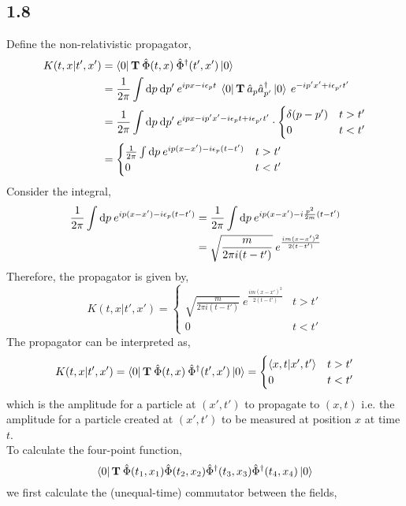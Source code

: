 \documentclass[12pt]{extarticle}
\newcommand{\field}{\hat{\Phi}}
\newcommand{\dfield}{\hat{\Phi}^\dagger}
\begin{document}
\subsection*{1.8}
Define the non-relativistic propagator, 
\begin{align*}
K(t,x|t',x') & = \bra{0} \bf{T} \: \field(t, x) \: \dfield(t', x') \ket{0}
\\
& = \frac{1}{2 \pi} \int \d{p} \d{p'} e^{i p x - i \epsilon_p t}  \: \bra{0} \bf{T} \: \a_p \adag_{p'} \ket{0} \: e^{- i p' x' + i \epsilon_{p'} t'} 
\\
& = \frac{1}{2 \pi} \int \d{p} \d{p'} e^{i p x - i p' x' - i \epsilon_p t + i \epsilon_{p'} t'} \cdot
\begin{cases}
\delta(p - p') & t > t'\\
0  & t < t'
\end{cases}
\\
& = 
\begin{cases}
\frac{1}{2 \pi} \int \d{p} e^{i p (x - x') - i \epsilon_p (t - t')} & t > t' \\
0 & t < t'
\end{cases}
\end{align*}
Consider the integral,
\begin{align*}
\frac{1}{2 \pi} \int \mathrm{d}p \: e^{i p (x - x') - i \epsilon_p (t - t')} & = \frac{1}{2 \pi} \int \mathrm{d}p \: e^{i p (x - x') - i \frac{p^2}{2m} (t - t')}
\\
& = \sqrt{\frac{m}{2 \pi i(t - t')}} \: e^{\frac{i m (x - x')^2}{2 (t - t')}}
\end{align*}
Therefore, the propagator is given by,
\[ K(t, x | t', x') = 
\begin{cases}
\sqrt{\frac{m}{2 \pi i(t - t')}} \: e^{\frac{i m (x - x')^2}{2 (t - t')}}  & t > t' \\
0 & t < t'
\end{cases}
\]
The propagator can be interpreted as, 
\[K(t, x| t', x') = \bra{0} \bf{T} \: \field(t, x) \: \dfield(t', x') \ket{0}
=
\begin{cases}
\inner{x, t}{x', t'} & t > t'\\
0 & t < t'
\end{cases}
\]
which is the amplitude for a particle at $(x', t')$ to propagate to $(x, t)$ i.e. the amplitude for a particle created at $(x', t')$ to be measured at position $x$ at time $t$. \bigskip \\
To calculate the four-point function,
\[\bra{0} \bf{T} \: \field(t_1, x_1) \field(t_2, x_2) \dfield(t_3, x_3) \dfield(t_4, x_4) \ket{0}\]
we first calculate the (unequal-time) commutator between the fields,
\end{document}
